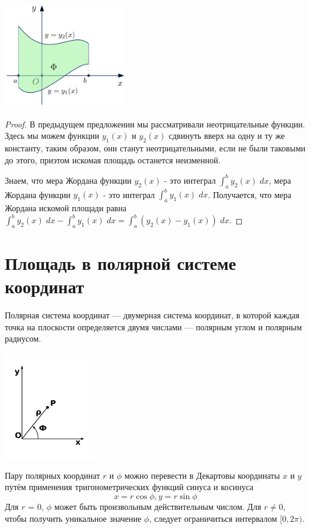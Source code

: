     \begin{center}
    	\includegraphics[width=0.4\textwidth]{img/lecture33/the_area_of_the_figure}
    \end{center}
    
    \begin{proof}
    	В предыдущем предложении мы рассматривали неотрицательные функции. Здесь мы можем функции $y_1(x)$ и $y_2(x)$ сдвинуть вверх на одну и ту же константу, таким образом, они станут неотрицательными, если не были таковыми до этого, приэтом искомая площадь останется неизменной.
    	
    	Знаем, что мера Жордана функции $y_2(x)$ - это интеграл $\int_a^b y_2(x) \; dx$, мера Жордана функции $y_1(x)$ - это интеграл $\int_a^b y_1(x) \; dx$. Получается, что мера Жордана искомой площади равна $\int_a^b y_2(x) \; dx - \int_a^b y_1(x) \; dx = \int_a^b (y_2(x) - y_1(x)) \; dx.$
    \end{proof}
    
    \section{Площадь в полярной системе координат}
    
    Полярная система координат — двумерная система координат, в которой каждая точка на плоскости определяется двумя числами — полярным углом и полярным радиусом. 
    \begin{center}
    	\includegraphics[width=0.3\textwidth]{img/lecture33/polar_coordinates}
    \end{center}
    Пару полярных координат $r$ и $\phi$ можно перевести в Декартовы координаты $x$ и $y$ путём применения тригонометрических функций синуса и косинуса
    \[ x = r\cos{\phi}, y = r\sin{\phi} \]
    Для $r$ = 0, $\phi$ может быть произвольным действительным числом. Для $r \neq 0$, чтобы получить уникальное значение $\phi$, следует ограничиться интервалом $[0, 2\pi)$.
    
